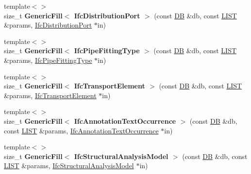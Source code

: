 \begin{DoxyCompactItemize}
\item 
\hypertarget{namespace_assimp_1_1_s_t_e_p_a672296d43eb1c3d19a19158d91d57070}{{\footnotesize template$<$$>$ }\\size\+\_\+t {\bfseries Generic\+Fill$<$ Ifc\+Distribution\+Port $>$} (const \hyperlink{class_assimp_1_1_s_t_e_p_1_1_d_b}{D\+B} \&db, const \hyperlink{class_assimp_1_1_s_t_e_p_1_1_e_x_p_r_e_s_s_1_1_l_i_s_t}{L\+I\+S\+T} \&params, \hyperlink{struct_assimp_1_1_i_f_c_1_1_ifc_distribution_port}{Ifc\+Distribution\+Port} $\ast$in)}\label{namespace_assimp_1_1_s_t_e_p_a672296d43eb1c3d19a19158d91d57070}

\item 
\hypertarget{namespace_assimp_1_1_s_t_e_p_afc84c793caa1c130ef2c1167ff9f3e4a}{{\footnotesize template$<$$>$ }\\size\+\_\+t {\bfseries Generic\+Fill$<$ Ifc\+Pipe\+Fitting\+Type $>$} (const \hyperlink{class_assimp_1_1_s_t_e_p_1_1_d_b}{D\+B} \&db, const \hyperlink{class_assimp_1_1_s_t_e_p_1_1_e_x_p_r_e_s_s_1_1_l_i_s_t}{L\+I\+S\+T} \&params, \hyperlink{struct_assimp_1_1_i_f_c_1_1_ifc_pipe_fitting_type}{Ifc\+Pipe\+Fitting\+Type} $\ast$in)}\label{namespace_assimp_1_1_s_t_e_p_afc84c793caa1c130ef2c1167ff9f3e4a}

\item 
\hypertarget{namespace_assimp_1_1_s_t_e_p_ac7eb9248320797812987be42f2c52011}{{\footnotesize template$<$$>$ }\\size\+\_\+t {\bfseries Generic\+Fill$<$ Ifc\+Transport\+Element $>$} (const \hyperlink{class_assimp_1_1_s_t_e_p_1_1_d_b}{D\+B} \&db, const \hyperlink{class_assimp_1_1_s_t_e_p_1_1_e_x_p_r_e_s_s_1_1_l_i_s_t}{L\+I\+S\+T} \&params, \hyperlink{struct_assimp_1_1_i_f_c_1_1_ifc_transport_element}{Ifc\+Transport\+Element} $\ast$in)}\label{namespace_assimp_1_1_s_t_e_p_ac7eb9248320797812987be42f2c52011}

\item 
\hypertarget{namespace_assimp_1_1_s_t_e_p_ad09917a0a125f3ec2dd566e79ca90583}{{\footnotesize template$<$$>$ }\\size\+\_\+t {\bfseries Generic\+Fill$<$ Ifc\+Annotation\+Text\+Occurrence $>$} (const \hyperlink{class_assimp_1_1_s_t_e_p_1_1_d_b}{D\+B} \&db, const \hyperlink{class_assimp_1_1_s_t_e_p_1_1_e_x_p_r_e_s_s_1_1_l_i_s_t}{L\+I\+S\+T} \&params, \hyperlink{struct_assimp_1_1_i_f_c_1_1_ifc_annotation_text_occurrence}{Ifc\+Annotation\+Text\+Occurrence} $\ast$in)}\label{namespace_assimp_1_1_s_t_e_p_ad09917a0a125f3ec2dd566e79ca90583}

\item 
\hypertarget{namespace_assimp_1_1_s_t_e_p_ae806887db32864aaba7093733c362912}{{\footnotesize template$<$$>$ }\\size\+\_\+t {\bfseries Generic\+Fill$<$ Ifc\+Structural\+Analysis\+Model $>$} (const \hyperlink{class_assimp_1_1_s_t_e_p_1_1_d_b}{D\+B} \&db, const \hyperlink{class_assimp_1_1_s_t_e_p_1_1_e_x_p_r_e_s_s_1_1_l_i_s_t}{L\+I\+S\+T} \&params, \hyperlink{struct_assimp_1_1_i_f_c_1_1_ifc_structural_analysis_model}{Ifc\+Structural\+Analysis\+Model} $\ast$in)}\label{namespace_assimp_1_1_s_t_e_p_ae806887db32864aaba7093733c362912}


\end{DoxyCompactItemize}
